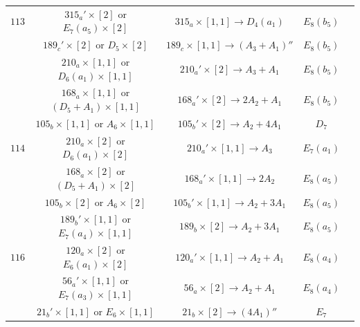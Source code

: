 \documentclass[reqno,12pt]{amsart}
\numberwithin{equation}{section}
\theoremstyle{plain}
\theoremstyle{definition}
\begin{document}
\begin{table}[htbp]
\begin{tabular}{|c|c|c|c|c|}
$ 113$  
&  $ 315_a'\times [2]$  or $E_7(a_5)\times [2]$&    $315_a\times [1,1] \rightarrow D_4(a_1)$  &   $ E_8(b_5)$      \\
 &  $ 189_c'\times [2]$  or $D_5\times [2]$&    $189_c\times [1,1] \rightarrow (A_3+A_1)''$  &   $ E_8(b_5)$      \\

 &  $ 210_a\times [1,1]$  or $D_6(a_1)\times [1,1]$&    $210_a'\times [2] \rightarrow A_3+A_1$  &   $ E_8(b_5)$      \\
 &  $ 168_a\times [1,1]$  or $(D_5+A_1)\times [1,1]$&    $168_a'\times [2] \rightarrow 2A_2+A_1$  &   $ E_8(b_5)$      \\
 &  $ 105_b\times [1,1]$  or $A_6\times [1,1]$&    $105_b'\times [2] \rightarrow A_2+4A_1$  &   $ D_7$      \\
  \hline

$ 114$  
&  $ 210_a\times [2]$  or $D_6(a_1)\times [2]$&    $210_a'\times [1,1] \rightarrow A_3$  &   $ E_7(a_1)$      \\
 &  $ 168_a\times [2]$  or $(D_5+A_1)\times [2]$&    $168_a'\times [1,1] \rightarrow 2A_2$  &   $ E_8(a_5)$      \\
 &  $ 105_b\times [2]$  or $A_6\times [2]$&    $105_b'\times [1,1] \rightarrow A_2+3A_1$  &   $ E_8(a_5)$      \\

 &  $ 189_b'\times [1,1]$  or $E_7(a_4)\times [1,1]$&    $189_b\times [2] \rightarrow A_2+3A_1$  &   $ E_8(a_5)$      \\
  \hline

$ 116$  
&  $ 120_a\times [2]$  or $E_6(a_1)\times [2]$&    $120_a'\times [1,1] \rightarrow A_2+A_1$ &   $ E_8(a_4)$      \\

 &  $ 56_a'\times [1,1]$  or $E_7(a_3)\times [1,1]$&    $56_a\times [2] \rightarrow A_2+A_1$  &   $ E_8(a_4)$      \\
 &  $ 21_b'\times [1,1]$  or $E_6\times [1,1]$&    $21_b\times [2] \rightarrow (4A_1)''$  &   $ E_7$      \\
  \hline





\end{tabular}
\end{table}
\end{document}

